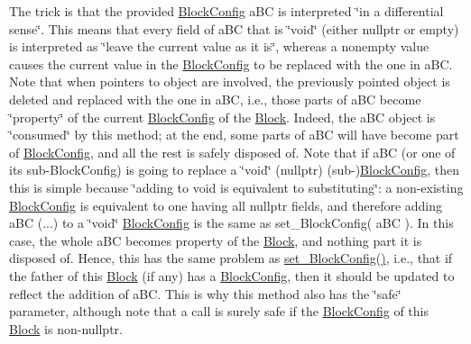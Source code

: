 The trick is that the provided \mbox{\hyperlink{class_s_m_spp__di__unipi__it_1_1_block_config}{Block\+Config}} a\+BC is interpreted \char`\"{}in a
differential sense\char`\"{}. This means that every field of a\+BC that is \char`\"{}void\char`\"{} (either nullptr or empty) is interpreted as \char`\"{}leave the current value as it
is\char`\"{}, whereas a nonempty value causes the current value in the \mbox{\hyperlink{class_s_m_spp__di__unipi__it_1_1_block_config}{Block\+Config}} to be replaced with the one in a\+BC. Note that when pointers to object are involved, the previously pointed object is deleted and replaced with the one in a\+BC, i.\+e., those parts of a\+BC become \char`\"{}property\char`\"{} of the current \mbox{\hyperlink{class_s_m_spp__di__unipi__it_1_1_block_config}{Block\+Config}} of the \mbox{\hyperlink{class_s_m_spp__di__unipi__it_1_1_block}{Block}}. Indeed, the a\+BC object is \char`\"{}consumed\char`\"{} by this method; at the end, some parts of a\+BC will have become part of \mbox{\hyperlink{class_s_m_spp__di__unipi__it_1_1_block_config}{Block\+Config}}, and all the rest is safely disposed of. Note that if a\+BC (or one of its sub-\/\+Block\+Config) is going to replace a \char`\"{}void\char`\"{} (nullptr) (sub-\/)\mbox{\hyperlink{class_s_m_spp__di__unipi__it_1_1_block_config}{Block\+Config}}, then this is simple because \char`\"{}adding to void is
equivalent to substituting\char`\"{}\+: a non-\/existing \mbox{\hyperlink{class_s_m_spp__di__unipi__it_1_1_block_config}{Block\+Config}} is equivalent to one having all nullptr fields, and therefore adding a\+BC (...) to a \char`\"{}void\char`\"{} \mbox{\hyperlink{class_s_m_spp__di__unipi__it_1_1_block_config}{Block\+Config}} is the same as set\+\_\+\+Block\+Config( a\+B\+C ). In this case, the whole a\+BC becomes property of the \mbox{\hyperlink{class_s_m_spp__di__unipi__it_1_1_block}{Block}}, and nothing part it is disposed of. Hence, this has the same problem as \mbox{\hyperlink{class_s_m_spp__di__unipi__it_1_1_block_a18d411b740a47db00d15083c5c7ef2ba}{set\+\_\+\+Block\+Config()}}, i.\+e., that if the father of this \mbox{\hyperlink{class_s_m_spp__di__unipi__it_1_1_block}{Block}} (if any) has a \mbox{\hyperlink{class_s_m_spp__di__unipi__it_1_1_block_config}{Block\+Config}}, then it should be updated to reflect the addition of a\+BC. This is why this method also has the \char`\"{}safe\char`\"{} parameter, although note that a call is surely safe if the \mbox{\hyperlink{class_s_m_spp__di__unipi__it_1_1_block_config}{Block\+Config}} of this \mbox{\hyperlink{class_s_m_spp__di__unipi__it_1_1_block}{Block}} is non-\/nullptr. \mbox{\label{class_s_m_spp__di__unipi__it_1_1_block_ab59584c81cf3770593fcf1b6371bafff}} 
